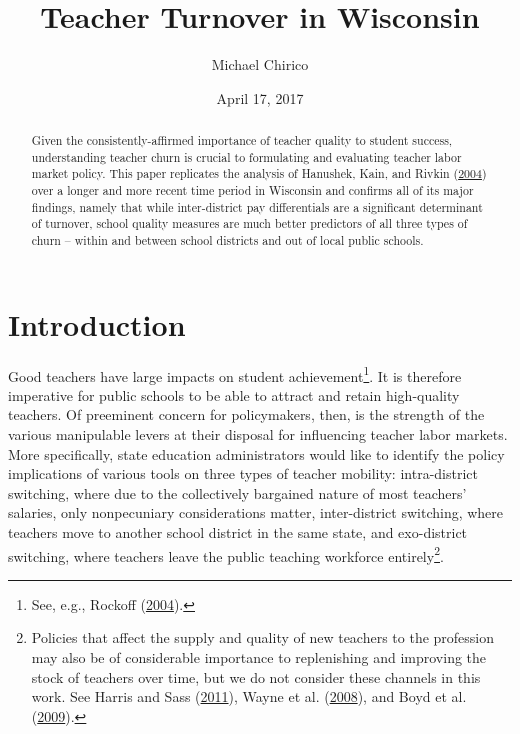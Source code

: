 \documentclass[12pt,]{article}
\title{Teacher Turnover in Wisconsin}
\author{Michael Chirico}
\date{April 17, 2017}
\let\rmarkdownfootnote\footnote%
\def\footnote{\protect\rmarkdownfootnote}
\begin{document}
\maketitle
\begin{abstract}
Given the consistently-affirmed importance of teacher quality to student
success, understanding teacher churn is crucial to formulating and
evaluating teacher labor market policy. This paper replicates the
analysis of Hanushek, Kain, and Rivkin
(\protect\hyperlink{ref-hanushek}{2004}) over a longer and more recent
time period in Wisconsin and confirms all of its major findings, namely
that while inter-district pay differentials are a significant
determinant of turnover, school quality measures are much better
predictors of all three types of churn -- within and between school
districts and out of local public schools.
\end{abstract}

\section{Introduction}\label{introduction}

Good teachers have large impacts on student achievement\footnote{See,
  e.g., Rockoff (\protect\hyperlink{ref-rockoff}{2004}).}. It is
therefore imperative for public schools to be able to attract and retain
high-quality teachers. Of preeminent concern for policymakers, then, is
the strength of the various manipulable levers at their disposal for
influencing teacher labor markets. More specifically, state education
administrators would like to identify the policy implications of various
tools on three types of teacher mobility: intra-district switching,
where due to the collectively bargained nature of most teachers'
salaries, only nonpecuniary considerations matter, inter-district
switching, where teachers move to another school district in the same
state, and exo-district switching, where teachers leave the public
teaching workforce entirely\footnote{Policies that affect the supply and
  quality of new teachers to the profession may also be of considerable
  importance to replenishing and improving the stock of teachers over
  time, but we do not consider these channels in this work. See Harris
  and Sass (\protect\hyperlink{ref-harris}{2011}), Wayne et al.
  (\protect\hyperlink{ref-wayne}{2008}), and Boyd et al.
  (\protect\hyperlink{ref-boyd2009}{2009}).}.
\end{document}
